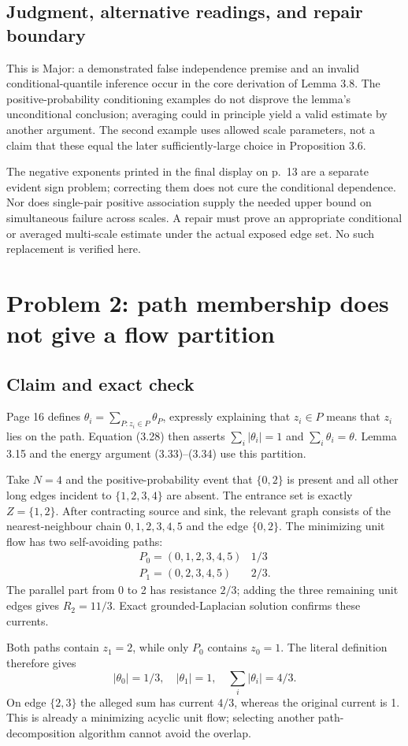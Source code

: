 \documentclass[10pt]{article}
\begin{document}
\subsection*{Judgment, alternative readings, and repair boundary}
This is Major: a demonstrated false independence premise and an invalid conditional-quantile inference occur in the core derivation of Lemma 3.8. The positive-probability conditioning examples do not disprove the lemma’s unconditional conclusion; averaging could in principle yield a valid estimate by another argument. The second example uses allowed scale parameters, not a claim that these equal the later sufficiently-large choice in Proposition 3.6.\par
The negative exponents printed in the final display on p. 13 are a separate evident sign problem; correcting them does not cure the conditional dependence. Nor does single-pair positive association supply the needed upper bound on simultaneous failure across scales. A repair must prove an appropriate conditional or averaged multi-scale estimate under the actual exposed edge set. No such replacement is verified here.\par
\section*{Problem 2: path membership does not give a flow partition}
\subsection*{Claim and exact check}
Page 16 defines \(\theta_i=\sum_{P:z_i\in P}\theta_P\), expressly explaining that \(z_i\in P\) means that \(z_i\) lies on the path. Equation (3.28) then asserts \(\sum_i|\theta_i|=1\) and \(\sum_i\theta_i=\theta\). Lemma 3.15 and the energy argument (3.33)–(3.34) use this partition.\par
Take \(N=4\) and the positive-probability event that \(\{0,2\}\) is present and all other long edges incident to \(\{1,2,3,4\}\) are absent. The entrance set is exactly \(Z=\{1,2\}\). After contracting source and sink, the relevant graph consists of the nearest-neighbour chain \(0,1,2,3,4,5\) and the edge \(\{0,2\}\). The minimizing unit flow has two self-avoiding paths: \[\begin{array}{c|c}
 P_0=(0,1,2,3,4,5)&1/3\\
 P_1=(0,2,3,4,5)&2/3 .
 \end{array}\] The parallel part from 0 to 2 has resistance \(2/3\); adding the three remaining unit edges gives \(\widehat R_2=11/3\). Exact grounded-Laplacian solution confirms these currents.\par
Both paths contain \(z_1=2\), while only \(P_0\) contains \(z_0=1\). The literal definition therefore gives \[|\theta_0|=1/3,\quad |\theta_1|=1,\quad
 \sum_i|\theta_i|=4/3.\] On edge \(\{2,3\}\) the alleged sum has current \(4/3\), whereas the original current is 1. This is already a minimizing acyclic unit flow; selecting another path-decomposition algorithm cannot avoid the overlap.\par
\end{document}
